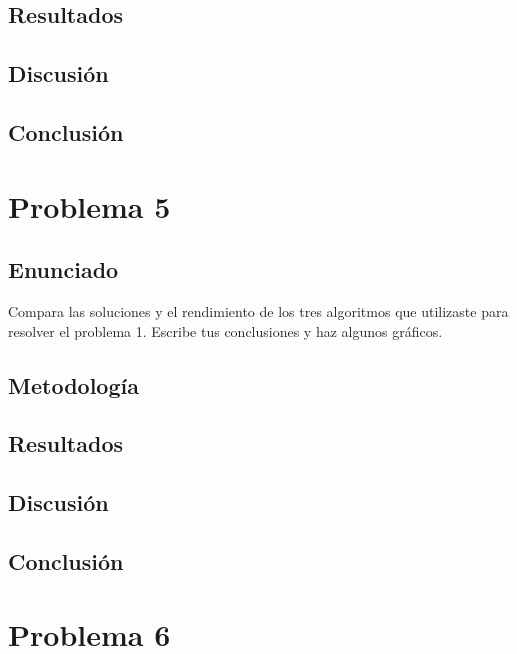 \documentclass{article}
\begin{document}
\subsection{Resultados}
\setcounter{equation}{0}

\subsection{Discusión}

\subsection{Conclusión}

\section{Problema 5}

\subsection{Enunciado}

Compara las soluciones y el rendimiento de los tres algoritmos que utilizaste para resolver el problema 1. Escribe tus conclusiones y haz algunos gráficos.

\subsection{Metodología}

\subsection{Resultados}
\setcounter{equation}{0}

\subsection{Discusión}

\subsection{Conclusión}

\section{Problema 6}
\end{document}
